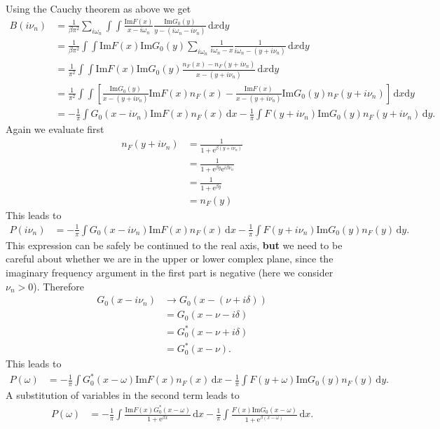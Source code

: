 \documentclass[12pt,a4paper]{scrartcl}
\numberwithin{equation}{section}
\begin{document}
Using the Cauchy theorem as above we get
\begin{align}
B(i\nu_n)  
&= \frac{1}{\beta \pi^2}\sum_{i\omega_n} \int\int 
          \frac{\mathrm{Im}F(x)  }{x -  i\omega_n          }
          \frac{\mathrm{Im}G_0(y)}{y - (i\omega_n - i\nu_n)} \, \mathrm{d}x\mathrm{d}y \\
%
&= \frac{1}{\beta \pi^2} \int\int \mathrm{Im}F(x)\mathrm{Im}G_0(y) 
    \sum_{i\omega_n} \frac{1}{i\omega_n - x }
                     \frac{1}{i\omega_n - (y+i\nu_n)} \, \mathrm{d}x\mathrm{d}y \\
%                     
&= \frac{1}{\pi^2} \int\int \mathrm{Im}F(x)\mathrm{Im}G_0(y) 
    \frac{n_F(x)-n_F(y+i\nu_n)}{x-(y+i\nu_n)} \, \mathrm{d}x\mathrm{d}y \\
%
&= \frac{1}{\pi^2} \int\int \left[
     \frac{ \mathrm{Im}G_0(y) }{x-(y+i\nu_n)} \mathrm{Im}F(x) n_F(x)
    -\frac{ \mathrm{Im}F(x) }{x-(y+i\nu_n)} \mathrm{Im}G_0(y)n_F(y+i\nu_n)
    \right]\, \mathrm{d}x\mathrm{d}y \\
%
&= -\frac{1}{\pi} \int G_0(x-i\nu_n) \mathrm{Im}F(x) n_F(x) \, \mathrm{d}x
   -\frac{1}{\pi} \int F(y+i\nu_n)  \mathrm{Im}G_0(y)n_F(y+i\nu_n) \, \mathrm{d}y .
%
\end{align}
Again we evaluate first
\begin{align}
 n_F(y+i\nu_n) &= \frac{1}{1 + \mathrm{e}^{\beta(y+i\nu_n)} } \\
 &=\frac{1}{1 + \mathrm{e}^{\beta y} \mathrm{e}^{i \beta \nu_n} } \\
 &=\frac{1}{1 + \mathrm{e}^{\beta y } } \\
 &= n_F(y)
\end{align}
This leads to 
\begin{align}
P(i\nu_n)
 &= -\frac{1}{\pi} \int G_0(x-i\nu_n) \mathrm{Im}F(x) n_F(x) \, \mathrm{d}x
   -\frac{1}{\pi} \int F(y+i\nu_n)  \mathrm{Im}G_0(y)n_F(y) \, \mathrm{d}y .
\end{align}
This expression can be safely be continued to the real axis, \textbf{but}
we need to be careful about whether we are in the upper or lower complex
plane, since the imaginary frequency argument in the first part is negative (here
we consider $\nu_n>0$). Therefore
\begin{align}
G_0(x-i\nu_n)
& \rightarrow G_0(x-(\nu+i\delta) ) \\
& = G_0(x-\nu-i\delta ) \\
& = G_0^*(x-\nu+i\delta ) \\
& = G_0^*(x-\nu ) .
\end{align}
This leads to
\begin{align}
P(\omega)
 &= -\frac{1}{\pi} \int G^*_0(x-\omega) \mathrm{Im}F(x) n_F(x) \, \mathrm{d}x
   -\frac{1}{\pi} \int F(y+\omega)  \mathrm{Im}G_0(y)n_F(y) \, \mathrm{d}y .
\end{align}
A substitution of variables in the second term leads to
\begin{align}
P(\omega)
 &= -\frac{1}{\pi} \int \frac{\mathrm{Im}F(x) G^*_0(x-\omega) }{1+\mathrm{e}^{\beta x}} \, \mathrm{d}x
   -\frac{1}{\pi} \int \frac{ F(x)  \mathrm{Im}G_0(x-\omega) }{1+\mathrm{e}^{\beta (x-\omega)}} \, \mathrm{d}x .
\end{align}
\end{document}
